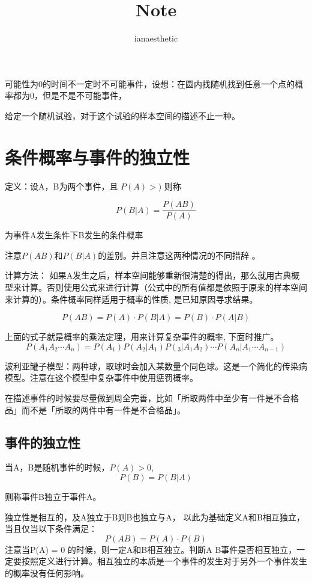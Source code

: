 \documentclass[10pt, a4paper]{article}
\title{Note}
\author{ianaesthetic}
\begin{document}
    \section{}
        可能性为0的时间不一定时不可能事件，设想：在圆内找随机找到任意一个点的概率都为0，但是不是不可能事件，

        给定一个随机试验，对于这个试验的样本空间的描述不止一种。    

    \section{条件概率与事件的独立性}
        定义：设A，B为两个事件，且 $P(A) > )$ 则称

        $$P(B|A) = \frac{P(AB)}{P(A)}$$
        
        为事件A发生条件下B发生的条件概率

        注意$P(AB)$和$P(B|A)$的差别。并且注意这两种情况的不同措辞 。 

        计算方法：
            如果A发生之后，样本空间能够重新很清楚的得出，那么就用古典概型来计算。否则使用公式来进行计算（公式中的所有值都是依照于原来的样本空间来计算的）。条件概率同样适用于概率的性质, 是已知原因寻求结果。

            $$P(AB) = P(A) \cdot P(B|A) = P(B) \cdot P(A|B)$$ 

            上面的式子就是概率的乘法定理，用来计算复杂事件的概率,  下面时推广。   
            $$P(A_1A_2\cdots A_n) = P(A_1)P(A_2|A_1)P(_3|A_1A_2)\cdots P(A_n|A_1\cdots A_{n-1})$$

            波利亚罐子模型：两种球，取球时会加入某数量个同色球。这是一个简化的传染病模型。注意在这个模型中复杂事件中使用惩罚概率。 

            在描述事件的时候要尽量做到周全完善，比如「所取两件中至少有一件是不合格品」而不是「所取的两件中有一件是不合格品」。
            \subsection{事件的独立性}
                当A，B是随机事件的时候，$P(A) > 0$, 
                $$P(B) = P(B|A)$$
                
                则称事件B独立于事件A。

                独立性是相互的，及A独立于B则B也独立与A， 以此为基础定义A和B相互独立，当且仅当以下条件满足：
                    $$P(AB) = P(A) \cdot P(B)$$
                注意当P(A) = 0 的时候，则一定A和B相互独立。判断A B事件是否相互独立，一定要按照定义进行计算。相互独立的本质是一个事件的发生对于另外一个事件发生的概率没有任何影响。
\end{document}
